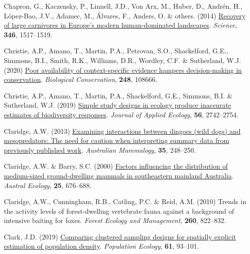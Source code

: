 \documentclass[11pt,a4paper,titlepage,twoside,openright]{style/unimelbthesis}
\newenvironment{CSLReferences}%
  {}%
  {\par}
\begin{document}
\begin{mainmatter}
\begin{CSLReferences}{1}{0}
\leavevmode{}%
Chapron, G., Kaczensky, P., Linnell, J.D., Von Arx, M., Huber, D., Andrén, H., López-Bao, J.V., Adamec, M., Álvares, F., Anders, O. \& others. (2014) \href{https://doi.org/10.1126/science.1257553}{Recovery of large carnivores in {E}urope's modern human-dominated landscapes}. \emph{Science}, \textbf{346}, 1517--1519.

\leavevmode{}%
Christie, A.P., Amano, T., Martin, P.A., Petrovan, S.O., Shackelford, G.E., Simmons, B.I., Smith, R.K., Williams, D.R., Wordley, C.F. \& Sutherland, W.J. (2020) \href{https://doi.org/10.1016/j.biocon.2020.108666}{Poor availability of context-specific evidence hampers decision-making in conservation}. \emph{Biological Conservation}, \textbf{248}, 108666.

\leavevmode{}%
Christie, A.P., Amano, T., Martin, P.A., Shackelford, G.E., Simmons, B.I. \& Sutherland, W.J. (2019) \href{https://doi.org/10.1111/1365-2664.13499}{Simple study designs in ecology produce inaccurate estimates of biodiversity responses}. \emph{Journal of Applied Ecology}, \textbf{56}, 2742--2754.

\leavevmode{}%
Claridge, A.W. (2013) \href{https://doi.org/10.1071/AM12026}{Examining interactions between dingoes (wild dogs) and mesopredators: The need for caution when interpreting summary data from previously published work}. \emph{Australian Mammalogy}, \textbf{35}, 248--250.

\leavevmode{}%
Claridge, A.W. \& Barry, S.C. (2000) \href{https://doi.org/10.1111/j.1442-9993.2000.tb00074.x}{Factors influencing the distribution of medium-sized ground-dwelling mammals in southeastern mainland {A}ustralia}. \emph{Austral Ecology}, \textbf{25}, 676--688.

\leavevmode{}%
Claridge, A.W., Cunningham, R.B., Catling, P.C. \& Reid, A.M. (2010) Trends in the activity levels of forest-dwelling vertebrate fauna against a background of intensive baiting for foxes. \emph{Forest Ecology and Management}, \textbf{260}, 822--832.

\leavevmode{}%
Clark, J.D. (2019) \href{https://doi.org/10.1002/1438-390X.1011}{Comparing clustered sampling designs for spatially explicit estimation of population density}. \emph{Population Ecology}, \textbf{61}, 93--101.


\end{CSLReferences}
\end{mainmatter}
\end{document}
